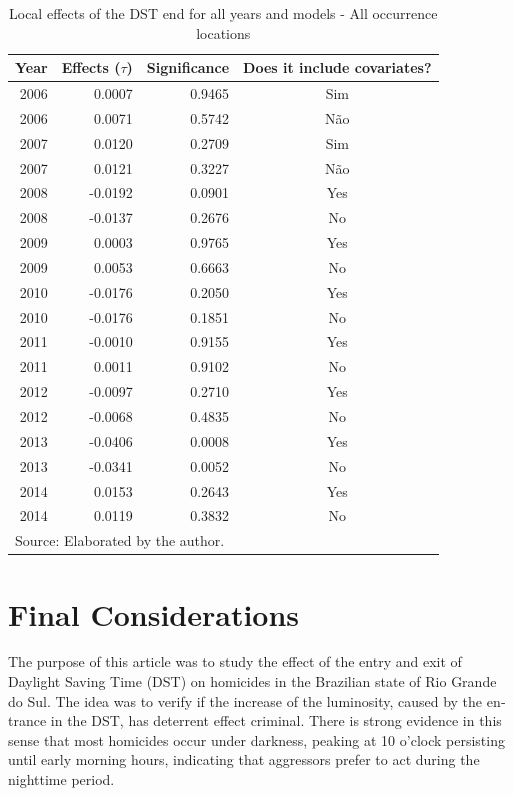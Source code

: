 \documentclass[12pt,openright,oneside,a4paper,english,french,spanish]{abntex2}
\numberwithin{table}{section} %
\numberwithin{figure}{section} %
\begin{document}
\begin{otherlanguage}{english}
\begin{table}[H]
\caption{Local effects of the DST end for all years and models - All occurrence locations}
\begin{center}
\begin{small}
\begin{tabular}{rrrc}
  \hline
Year & Effects ($\tau$) & Significance & Does it include covariates? \\ 
  \hline
2006 & 0.0007 & 0.9465 & Sim \\ 
2006 & 0.0071 & 0.5742 & Não \\ 
2007 & 0.0120 & 0.2709 & Sim \\ 
2007 & 0.0121 & 0.3227 & Não \\
2008 & -0.0192 & 0.0901 & Yes \\ 
2008 & -0.0137 & 0.2676 & No \\ 
2009 & 0.0003 & 0.9765 & Yes \\ 
2009 & 0.0053 & 0.6663 & No \\ 
2010 & -0.0176 & 0.2050 & Yes \\ 
2010 & -0.0176 & 0.1851 & No \\ 
2011 & -0.0010 & 0.9155 & Yes \\ 
2011 & 0.0011 & 0.9102 & No \\ 
2012 & -0.0097 & 0.2710 & Yes \\ 
2012 & -0.0068 & 0.4835 & No \\ 
2013 & -0.0406 & 0.0008 & Yes \\ 
2013 & -0.0341 & 0.0052 & No \\ 
2014 & 0.0153 & 0.2643 & Yes \\ 
2014 & 0.0119 & 0.3832 & No \\
   \hline
\multicolumn{4}{l}{Source: Elaborated by the author.}
\end{tabular}
\end{small}
\end{center}
\label{tab:resultados_taus_saida_RS_TODOS_LOCAIS}
\end{table}




\section{Final Considerations\label{discussoes_e_consideracoes}}

The purpose of this article was to study the effect of the entry and exit of Daylight Saving Time (DST) on homicides in the Brazilian state of Rio Grande do Sul. The idea was to verify if the increase of the luminosity, caused by the entrance in the DST, has deterrent effect criminal. There is strong evidence in this sense that most homicides occur under darkness, peaking at 10 o'clock persisting until early morning hours, indicating that aggressors prefer to act during the nighttime period.


\end{otherlanguage}
\end{document}
